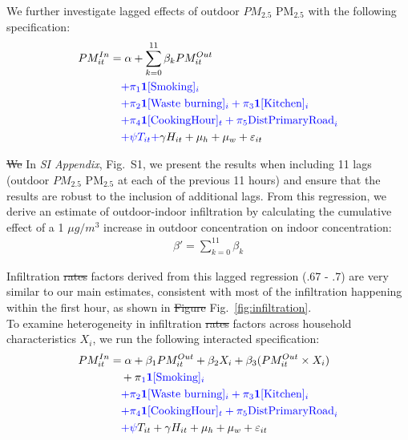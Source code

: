 \documentclass[reqno,12pt,notitlepage]{article}
\providecommand{\DIFadd}[1]{{\protect\color{BLUE}#1}} %
\providecommand{\DIFdel}[1]{{\protect\color{red}\sout{#1}}} %
\providecommand{\DIFaddbegin}{} %
\providecommand{\DIFaddend}{} %
\providecommand{\DIFdelbegin}{} %
\providecommand{\DIFdelend}{} %
\begin{document}
We further investigate lagged effects of outdoor \DIFdelbegin \DIFdel{$PM_{2.5}$ }\DIFdelend \DIFaddbegin \DIFadd{PM$_{2.5}$ }\DIFaddend with the following specification:
\begin{align}
     PM^{In}_{it} &= \alpha + \sum_{k = 0}^{11}\beta_k PM^{Out}_{it} \DIFaddbegin \\
     &\quad \DIFadd{+ \pi_1 \mathbf{1}[\text{Smoking}]_i } \notag \\ &\DIFadd{\quad + \pi_2 \mathbf{1}[\text{Waste burning}]_i + \pi_3 \mathbf{1}[\text{Kitchen}]_i } \notag \\ &\DIFadd{\quad + \pi_4 \mathbf{1}[\text{CookingHour}]_t + \pi_5 \text{DistPrimaryRoad}_i } \notag \\ &\DIFadd{\quad + \psi T_{it} + }\DIFaddend \gamma H_{it} + \mu_h + \mu_w + \varepsilon_{it} \notag
\end{align}

\DIFdelbegin \DIFdel{We }\DIFdelend \DIFaddbegin \DIFadd{In \textit{SI Appendix}, Fig.\ S1, we }\DIFaddend present the results when including 11 lags (outdoor \DIFdelbegin \DIFdel{$PM_{2.5}$ }\DIFdelend \DIFaddbegin \DIFadd{PM$_{2.5}$ }\DIFaddend at each of the previous 11 hours) and ensure that the results are robust to the inclusion of additional lags. From this regression, we derive an estimate of outdoor-indoor infiltration by calculating the cumulative effect of a 1 $\mu g/m^3$ increase in outdoor concentration on indoor concentration:
\begin{align}
    \beta' = \sum_{k=0}^{11} \beta_k
\end{align}

Infiltration \DIFdelbegin \DIFdel{rates }\DIFdelend \DIFaddbegin \DIFadd{factors }\DIFaddend derived from this lagged regression \DIFaddbegin \DIFadd{(.67 - .7) }\DIFaddend are very similar to our main estimates, consistent with most of the infiltration happening within the first hour, as shown in \DIFdelbegin \DIFdel{Figure }\DIFdelend \DIFaddbegin \DIFadd{Fig.\ }\DIFaddend \ref{fig:infiltration}.
\\

To examine heterogeneity in infiltration \DIFdelbegin \DIFdel{rates }\DIFdelend \DIFaddbegin \DIFadd{factors }\DIFaddend across household characteristics $X_i$, we run the following interacted specification:
\begin{align}
    PM^{In}_{it} &= \alpha + \beta_1 PM^{Out}_{it} + \beta_2 X_i + \beta_3(PM^{Out}_{it} \times X_i) \\ 
    &\quad + \pi\DIFaddbegin \DIFadd{_1 \mathbf{1}[\text{Smoking}]_i } \notag \\
    &\DIFadd{\quad + \pi_2 \mathbf{1}[\text{Waste burning}]_i + \pi_3 \mathbf{1}[\text{Kitchen}]_i } \notag \\ &\DIFadd{\quad + \pi_4 \mathbf{1}[\text{CookingHour}]_t + \pi_5 \text{DistPrimaryRoad}_i } \notag \\ &\DIFadd{\quad + \psi }\DIFaddend T_{it} + \gamma H_{it} + \mu_h + \mu_w + \varepsilon_{it} \notag
\end{align}
\end{document}
